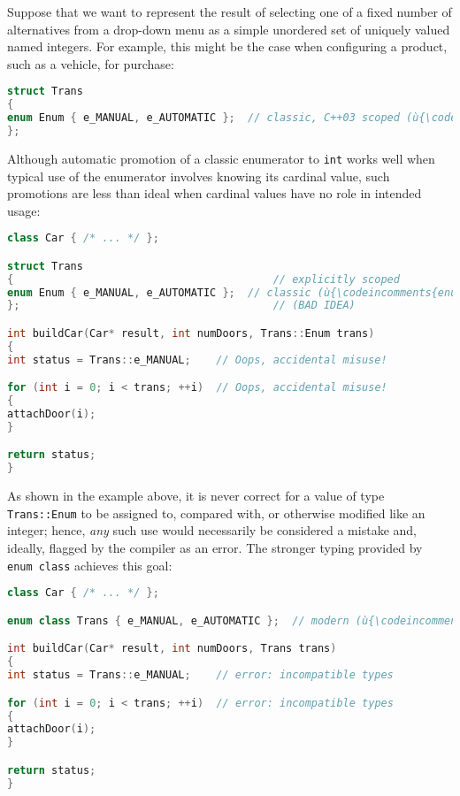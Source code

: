Suppose that we want to represent the result of selecting one of a fixed
number of alternatives from a drop-down menu as a simple unordered set
of uniquely valued named integers. For example, this might be the case
when configuring a product, such as a vehicle, for purchase:

\begin{lstlisting}[language=C++]
struct Trans
{
enum Enum { e_MANUAL, e_AUTOMATIC };  // classic, C++03 scoped (ù{\codeincomments{enum}}ù)
};
\end{lstlisting}

\noindent Although automatic promotion of a classic enumerator to \texttt{int}
works well when typical use of the enumerator involves knowing its
cardinal value, such promotions are less than ideal when cardinal values
have no role in intended usage:

\begin{lstlisting}[language=C++]
class Car { /* ... */ };

struct Trans
{                                         // explicitly scoped
enum Enum { e_MANUAL, e_AUTOMATIC };  // classic (ù{\codeincomments{enum}}ù)
};                                        // (BAD IDEA)

int buildCar(Car* result, int numDoors, Trans::Enum trans)
{
int status = Trans::e_MANUAL;    // Oops, accidental misuse!

for (int i = 0; i < trans; ++i)  // Oops, accidental misuse!
{
attachDoor(i);
}

return status;
}
\end{lstlisting}

\noindent As shown in the example above, it is never correct for a value of type
\texttt{Trans::Enum} to be assigned to, compared with, or otherwise
modified like an integer; hence, \emph{any} such use would necessarily
be considered a mistake and, ideally, flagged by the compiler as an
error. The stronger typing provided by \texttt{enum}~\texttt{class}
achieves this goal:

\begin{lstlisting}[language=C++]
class Car { /* ... */ };

enum class Trans { e_MANUAL, e_AUTOMATIC };  // modern (ù{\codeincomments{enum class}}ù) (GOOD IDEA)

int buildCar(Car* result, int numDoors, Trans trans)
{
int status = Trans::e_MANUAL;    // error: incompatible types

for (int i = 0; i < trans; ++i)  // error: incompatible types
{
attachDoor(i);
}

return status;
}
\end{lstlisting}

